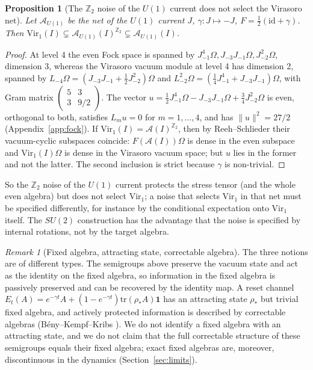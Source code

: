 \documentclass[12pt]{article}
\newtheorem{proposition}[theorem]{Proposition}
\theoremstyle{definition}
\theoremstyle{remark}
\newtheorem{remark}[theorem]{Remark}
\begin{document}
\begin{proposition}[The \(\mathbb Z_2\) noise of the \(U(1)\) current does not select the Virasoro net]\label{prop:U1}
Let \(\mathcal A_{U(1)}\) be the net of the \(U(1)\) current \(J\), \(\gamma:J\mapsto-J\),
\(F=\tfrac12(\mathrm{id}+\gamma)\). Then
\(\mathrm{Vir}_1(I)\subsetneq\mathcal A_{U(1)}(I)^{\mathbb Z_2}\subsetneq\mathcal A_{U(1)}(I)\).
\end{proposition}
\begin{proof}
At level 4 the even Fock space is spanned by \(J_{-1}^4\Omega,J_{-3}J_{-1}\Omega,J_{-2}^2\Omega\),
dimension 3, whereas the Virasoro vacuum module at level 4 has dimension 2, spanned by
\(L_{-4}\Omega=(J_{-3}J_{-1}+\tfrac12J_{-2}^2)\Omega\) and
\(L_{-2}^2\Omega=(\tfrac14J_{-1}^4+J_{-3}J_{-1})\Omega\), with Gram matrix
\(\left(\begin{smallmatrix}5&3\\3&9/2\end{smallmatrix}\right)\). The vector
\(u=\tfrac12J_{-1}^4\Omega-J_{-3}J_{-1}\Omega+\tfrac34J_{-2}^2\Omega\) is even,
orthogonal to both, satisfies \(L_mu=0\) for \(m=1,\dots,4\), and has
\(\|u\|^2=27/2\) (Appendix~\ref{app:fock}). If \(\mathrm{Vir}_1(I)=\mathcal A(I)^{\mathbb Z_2}\), then
by Reeh--Schlieder their vacuum-cyclic subspaces coincide: \(F(\mathcal A(I))\Omega\)
is dense in the even subspace and \(\mathrm{Vir}_1(I)\Omega\) is dense in the
Virasoro vacuum space; but \(u\) lies in the former and not the latter. The second
inclusion is strict because \(\gamma\) is non-trivial.
\end{proof}
So the \(\mathbb Z_2\) noise of the \(U(1)\) current protects the stress tensor (and the
whole even algebra) but does not select \(\mathrm{Vir}_1\); a noise that selects
\(\mathrm{Vir}_1\) in that net must be specified differently, for instance by the
conditional expectation onto \(\mathrm{Vir}_1\) itself. The \(SU(2)\) construction
has the advantage that the noise is specified by internal rotations, not by the target
algebra.

\begin{remark}[Fixed algebra, attracting state, correctable algebra]
The three notions are of different types. The semigroups above preserve the vacuum
state and act as the identity on the fixed algebra, so information in the fixed algebra
is passively preserved and can be recovered by the identity map. A reset channel \(E_t(A)=e^{-\gamma t}A+(1-e^{-\gamma t})\mathrm{tr}(\rho_*A)\mathbf 1\)
has an attracting state \(\rho_*\) but trivial fixed algebra, and actively protected
information is described by correctable algebras (B\'eny--Kempf--Kribs \cite{BKK}). We do
not identify a fixed algebra with an attracting state, and we do not claim that the full
correctable structure of these semigroups equals their fixed algebra; exact fixed
algebras are, moreover, discontinuous in the dynamics (Section~\ref{sec:limits}).
\end{remark}
\end{document}
